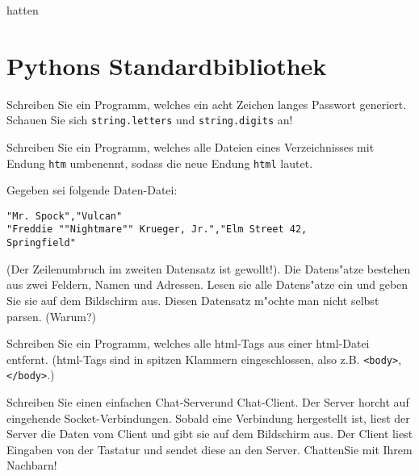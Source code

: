 hatten\section*{Pythons Standardbibliothek}

\begin{aufgabe}
Schreiben Sie ein Programm, welches ein acht Zeichen langes Passwort generiert. \hinweis Schauen Sie sich \lstinline{string.letters} und \lstinline{string.digits} an!
\end{aufgabe}

\begin{aufgabe}
Schreiben Sie ein Programm, welches alle Dateien eines Verzeichnisses mit Endung \texttt{htm} umbenennt, sodass die neue Endung \texttt{html} lautet.
\end{aufgabe}

\begin{aufgabe}
Gegeben sei folgende Daten-Datei:
\begin{verbatim}
"Mr. Spock","Vulcan"
"Freddie ""Nightmare"" Krueger, Jr.","Elm Street 42,
Springfield" 
\end{verbatim}
(Der Zeilenumbruch im zweiten Datensatz ist gewollt!). Die Datens"atze bestehen aus zwei Feldern, Namen und Adressen. Lesen sie alle Datens"atze ein und geben Sie sie auf dem Bildschirm aus. \hinweis Diesen Datensatz m"ochte man nicht selbst parsen. (Warum?)
\end{aufgabe}

\begin{aufgabe}
Schreiben Sie ein Programm, welches alle html-Tags aus einer html-Datei entfernt. (html-Tags sind in spitzen Klammern eingeschlossen, also z.B. \texttt{<body>}, \texttt{</body>}.)
\end{aufgabe}

\begin{aufgabe}
Schreiben Sie einen einfachen \glqq Chat-Server\grqq und \glqq Chat-Client\grqq . Der Server horcht auf eingehende Socket-Verbindungen. Sobald eine Verbindung hergestellt ist, liest der Server die Daten vom Client und gibt sie auf dem Bildschirm aus. Der Client liest Eingaben von der Tastatur und sendet diese an den Server. \glqq Chatten\grqq Sie mit Ihrem Nachbarn! 
\end{aufgabe}



